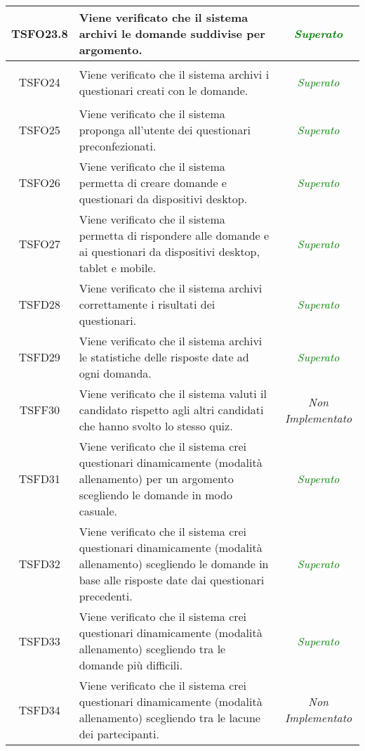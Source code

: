 \begin{longtable}{|c|>{}m{8cm}|c|}
\hypertarget{TSFO23.8}{TSFO23.8} & Viene verificato che il sistema archivi le domande suddivise per argomento. & \textcolor{Green}{\textit{Superato}}\\ \hline
\hypertarget{TSFO24}{TSFO24} & Viene verificato che il sistema archivi i questionari creati con le domande. & \textcolor{Green}{\textit{Superato}}\\ \hline
\hypertarget{TSFO25}{TSFO25} & Viene verificato che il sistema proponga all'utente dei questionari preconfezionati. & \textcolor{Green}{\textit{Superato}}\\ \hline
\hypertarget{TSFO26}{TSFO26} & Viene verificato che il sistema permetta di creare domande e questionari da dispositivi desktop. & \textcolor{Green}{\textit{Superato}}\\ \hline
\hypertarget{TSFO27}{TSFO27} & Viene verificato che il sistema permetta di rispondere alle domande e ai questionari da dispositivi desktop, tablet e mobile. & \textcolor{Green}{\textit{Superato}}\\ \hline
\hypertarget{TSFD28}{TSFD28} & Viene verificato che il sistema archivi correttamente i risultati dei questionari. & \textcolor{Green}{\textit{Superato}}\\ \hline
\hypertarget{TSFD29}{TSFD29} & Viene verificato che il sistema archivi le statistiche delle risposte date ad ogni domanda. & \textcolor{Green}{\textit{Superato}}\\ \hline
\hypertarget{TSFF30}{TSFF30} & Viene verificato che il sistema valuti il candidato rispetto agli altri candidati che hanno svolto lo stesso quiz. & \textit{Non Implementato}\\ \hline
\hypertarget{TSFD31}{TSFD31} & Viene verificato che il sistema crei questionari dinamicamente (modalità allenamento) per un argomento scegliendo le domande in modo casuale. & \textcolor{Green}{\textit{Superato}}\\ \hline
\hypertarget{TSFD32}{TSFD32} & Viene verificato che il sistema crei questionari dinamicamente (modalità allenamento) scegliendo le domande in base alle risposte date dai questionari precedenti. & \textcolor{Green}{\textit{Superato}}\\ \hline
\hypertarget{TSFD33}{TSFD33} & Viene verificato che il sistema crei questionari dinamicamente (modalità allenamento) scegliendo tra le domande più difficili. & \textcolor{Green}{\textit{Superato}}\\ \hline
\hypertarget{TSFD34}{TSFD34} & Viene verificato che il sistema crei questionari dinamicamente (modalità allenamento) scegliendo tra le lacune dei partecipanti. & \textit{Non Implementato}\\ \hline

\end{longtable}
